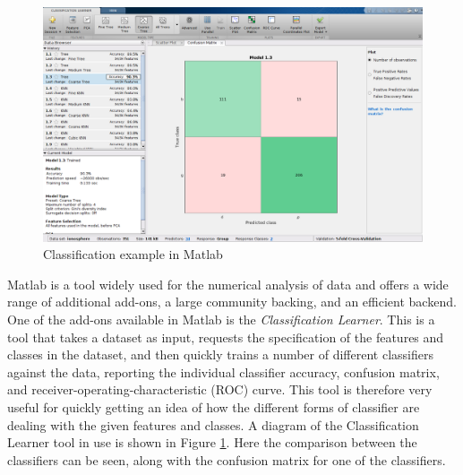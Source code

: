 \begin{figure}[ht]
    \centering
    \includegraphics[width=\textwidth]{04-Methodology/mlClassificationLearner.png}
    \caption{Classification example in Matlab}
    \label{fig:classLearnerSamp}
\end{figure}
Matlab is a tool widely used for the numerical analysis of data and offers a wide range of additional add-ons, a large community backing, and an efficient backend. One of the add-ons available in Matlab is the \emph{Classification Learner}. This is a tool that takes a dataset as input, requests the specification of the features and classes in the dataset, and then quickly trains a number of different classifiers against the data, reporting the individual classifier accuracy, confusion matrix, and receiver-operating-characteristic (ROC) curve. This tool is therefore very useful for quickly getting an idea of how the different forms of classifier are dealing with the given features and classes. A diagram of the Classification Learner tool in use is shown in Figure \ref{fig:classLearnerSamp}. Here the comparison between the classifiers can be seen, along with the confusion matrix for one of the classifiers.\\

